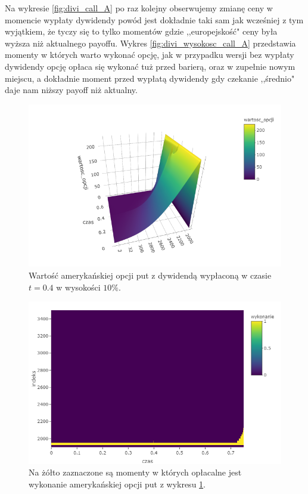\documentclass[12pt]{article}
\begin{document}
Na wykresie \ref{fig:divi_call_A} po raz kolejny obserwujemy zmianę ceny w momencie wypłaty dywidendy powód jest dokładnie taki sam jak wcześniej z tym wyjątkiem, że tyczy się to tylko momentów gdzie ,,europejskość" ceny była wyższa niż aktualnego payoffu. Wykres \ref{fig:divi_wysokosc_call_A} przedstawia momenty w których warto wykonać opcję, jak w przypadku wersji bez wypłaty dywidendy opcję opłaca się wykonać tuż przed barierą, oraz w zupełnie nowym miejscu, a dokładnie moment przed wypłatą dywidendy gdy czekanie ,,średnio" daje nam niższy payoff niż aktualny.


\begin{figure}[H]
    \centering
    \includegraphics[width=\textwidth,height=\textheight,keepaspectratio]{dividend/put_A_dywidenda.png}
    \caption{Wartość amerykańskiej opcji put z dywidendą wypłaconą w czasie $t = 0.4$ w wysokości $10\%$.}
    \label{fig:divi_put_A}
\end{figure}

\begin{figure}[H]
    \centering
    \includegraphics[width=\textwidth,height=\textheight,keepaspectratio]{dividend/wykonanie_put.png}
    \caption{Na żółto zaznaczone są momenty w których opłacalne jest wykonanie amerykańskiej opcji put z wykresu \ref{fig:divi_put_A}.}
    \label{fig:wykonanie_put}
\end{figure}
\end{document}
